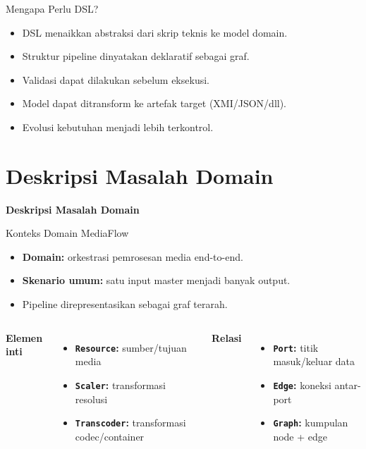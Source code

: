 \documentclass[aspectratio=169, table]{beamer}
\begin{document}
\begin{frame}{Mengapa Perlu DSL?}
\vspace{6pt}
\begin{itemize}
  \item DSL menaikkan abstraksi dari skrip teknis ke model domain.
  \item Struktur pipeline dinyatakan deklaratif sebagai graf.
  \item Validasi dapat dilakukan sebelum eksekusi.
  \item Model dapat ditransform ke artefak target (XMI/JSON/dll).
  \item Evolusi kebutuhan menjadi lebih terkontrol.
\end{itemize}
\end{frame}

\section{Deskripsi Masalah Domain}
\begin{frame}{\hfill}
	\centering
	\Huge{\textbf{Deskripsi Masalah Domain}}
\end{frame}

\begin{frame}{Konteks Domain MediaFlow}
\vspace{6pt}
\begin{itemize}
  \item \textbf{Domain:} orkestrasi pemrosesan media end-to-end.
  \item \textbf{Skenario umum:} satu input master menjadi banyak output.
  \item Pipeline direpresentasikan sebagai graf terarah.
\end{itemize}

\vspace{4pt}
\begin{columns}[T]
\textbf{Elemen inti}
\begin{itemize}
  \item \textbf{\texttt{Resource}:} sumber/tujuan media
  \item \textbf{\texttt{Scaler}:} transformasi resolusi
  \item \textbf{\texttt{Transcoder}:} transformasi codec/container
\end{itemize}

\textbf{Relasi}
\begin{itemize}
  \item \textbf{\texttt{Port}:} titik masuk/keluar data
  \item \textbf{\texttt{Edge}:} koneksi antar-port
  \item \textbf{\texttt{Graph}:} kumpulan node + edge
\end{itemize}
\end{columns}
\end{frame}
\end{document}
